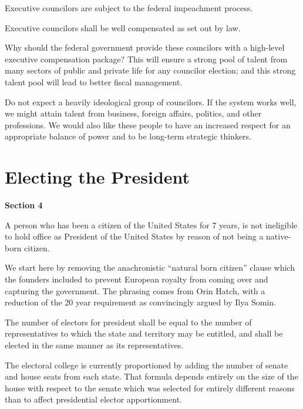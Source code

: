 \documentclass{article}
\begin{document}
\begin{quoting}
Executive councilors are subject to the federal impeachment process.

Executive councilors shall be well compensated as set out by law.
\end{quoting}

Why should the federal government provide these councilors with a high-level executive compensation package? This will ensure a strong pool of talent from many sectors of public and private life for any councilor election; and this strong talent pool will lead to better fiscal management.

Do not expect a heavily ideological group of councilors. If the system works well, we might attain talent from business, foreign affairs, politics, and other professions. We would also like these people to have an increased respect for an appropriate balance of power and to be long-term strategic thinkers.

\section{Electing the President}

\begin{quoting}
\textbf{Section 4}

A person who has been a citizen of the United States for 7 years, is not ineligible to hold office as President of the United States by reason of not being a native-born citizen.
\end{quoting}

We start here by removing the anachronistic “natural born citizen” clause which the founders included to prevent European royalty from coming over and capturing the government. The phrasing comes from Orin Hatch\cite{Somin_Hatch}, with a reduction of the 20 year requirement as convincingly argued by Ilya Somin\cite{Somin_NBC}.

\begin{quoting}
The number of electors for president shall be equal to the number of representatives to which the state and territory may be entitled, and shall be elected in the same manner as its representatives.
\end{quoting}

The electoral college is currently proportioned by adding the number of senate and house seats from each state. That formula depends entirely on the size of the house with respect to the senate which was selected for entirely different reasons than to affect presidential elector apportionment.
\end{document}
